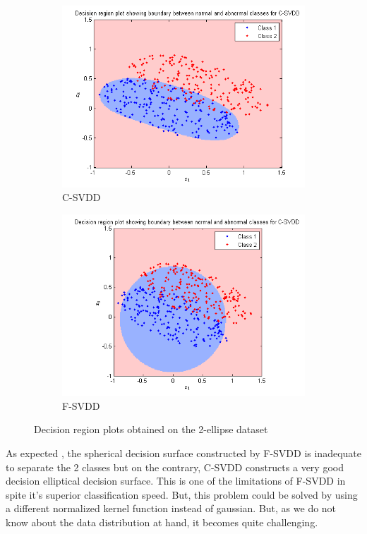 \documentclass{article} %
\begin{document}
\begin{figure}
\begin{subfigure}{.5\textwidth}
  \centering
  \includegraphics[width=\linewidth]{Plots/Ellipse/svdd/decn}
\caption{C-SVDD} 
\end{subfigure}%
\begin{subfigure}{.5\textwidth}
  \centering
  \includegraphics[width=\linewidth]{Plots/Ellipse/fsvdd/decn}
\caption{F-SVDD}  
\end{subfigure}
\caption{Decision region plots obtained on the 2-ellipse dataset}
\end{figure}


As expected , the spherical decision surface constructed by F-SVDD is inadequate to separate the 2 classes but on the contrary, C-SVDD constructs a very good decision elliptical decision surface. This is one of the limitations of F-SVDD in spite it's superior classification speed. But, this problem could be solved by using a different normalized kernel function instead of gaussian. But, as we do not know about the data distribution at hand, it becomes quite challenging.
\end{document}

